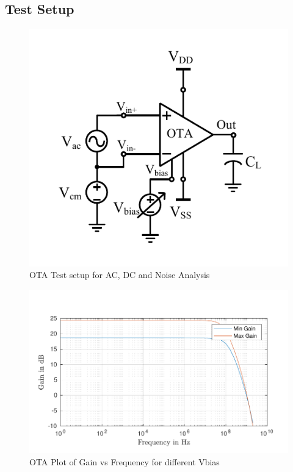 \subsection{Test Setup}


\begin{figure} [H]
\centering
\includegraphics[scale=1]{Figures/Test_Benches/OTA/OTA_ACDC.pdf}
\caption{OTA Test setup for AC, DC and Noise Analysis}
\end{figure}


\begin{figure} [H]
\centering
\includegraphics[scale=1]{Figures/Plots/OTA_Gain.pdf}
\caption{OTA Plot of Gain vs Frequency for different Vbias}
\end{figure}

